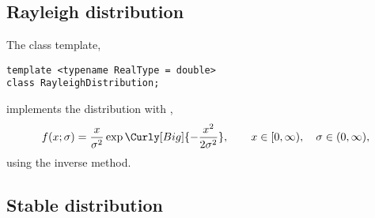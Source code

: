 \subsection{Rayleigh distribution}
\label{sub:Rayleigh distribution}

The class template,
\begin{verbatim}
template <typename RealType = double>
class RayleighDistribution;
\end{verbatim}
implements the distribution with \pdf,
\begin{equation*}
  f(x;\sigma) =
  \frac{x}{\sigma^2}\exp\Curly[Big]{-\frac{x^2}{2\sigma^2}},\qquad
  x \in [0, \infty),\quad \sigma \in (0, \infty),
\end{equation*}
using the inverse method.

\subsection{Stable distribution}
\label{sub:Stable distribution}

